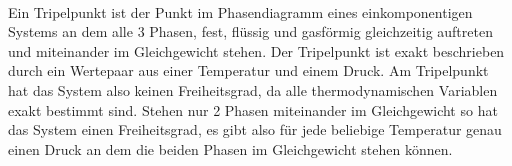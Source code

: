\documentclass[11pt,a4paper]{article}
\numberwithin{equation}{section}
\numberwithin{figure}{section}
\begin{document}
\\
\begin{addmargin}[25pt]{0pt}
Ein Tripelpunkt ist der Punkt im Phasendiagramm eines einkomponentigen Systems an dem alle 3 Phasen, fest, flüssig und gasförmig gleichzeitig auftreten und miteinander im Gleichgewicht stehen. Der Tripelpunkt ist exakt beschrieben durch ein Wertepaar aus einer Temperatur und einem Druck. Am Tripelpunkt hat das System also keinen Freiheitsgrad, da alle thermodynamischen Variablen exakt bestimmt sind. Stehen nur 2 Phasen miteinander im Gleichgewicht so hat das System einen Freiheitsgrad, es gibt also für jede beliebige Temperatur genau einen Druck an dem die beiden Phasen im Gleichgewicht stehen können.\\
\end{addmargin}
\end{document}
